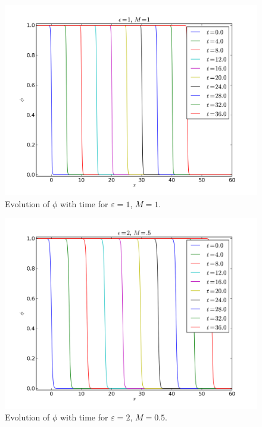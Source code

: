 \documentclass[12pt]{article}
\let\epsilon\varepsilon
\begin{document}
\begin{figure}[htbp]
  \centering
  \begin{minipage}[t]{.8\linewidth}
    \centering
    \includegraphics[width=\linewidth]{img/1D_eps1_M1}
    \caption{Evolution of $\phi$ with time for $\epsilon= 1$, $M = 1$.}
    \label{fig:esp1M1}
  \end{minipage}
\end{figure}

\begin{figure}[htbp]
  \centering
  \begin{minipage}[t]{.8\linewidth}
    \centering
    \includegraphics[width=\linewidth]{img/1D_eps2_M05}
    \caption{Evolution of $\phi$ with time for $\epsilon= 2$, $M =
    0.5$.}
    \label{fig:esp2M.5}
  \end{minipage}
\end{figure}


\end{document}
